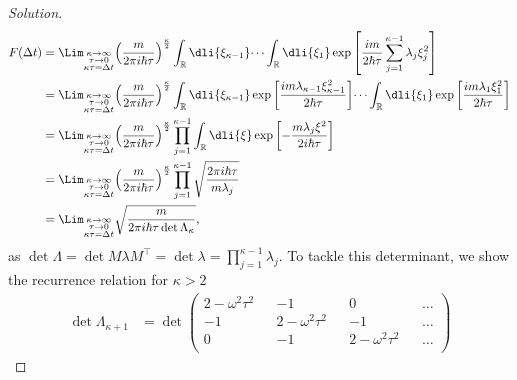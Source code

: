 \begin{proof}[Solution]
   \begin{align*}
      F(\Delta t) &= \Lim_{\substack{\kappa \to \infty\\ \tau \to 0\\ \kappa \tau = \Delta t}}{\left(\frac{m}{2\pi i \hbar \tau}\right)^{\frac\kappa2}\int_{\mathbb{R}} \dli{\xi_{\kappa - 1}} \dots \int_{\mathbb{R}} \dli{\xi_1} \exp\left[\frac{im}{2 \hbar \tau} \sum_{j = 1}^{\kappa - 1} \lambda_j \xi_j^2\right]}\\
                  &= \Lim_{\substack{\kappa \to \infty\\ \tau \to 0\\ \kappa \tau = \Delta t}}{\left(\frac{m}{2\pi i \hbar \tau}\right)^{\frac\kappa2}\int_{\mathbb{R}} \dli{\xi_{\kappa - 1}} \exp\left[\frac{im \lambda_{\kappa - 1} \xi_{\kappa - 1}^2}{2 \hbar \tau}\right]\dots \int_{\mathbb{R}} \dli{\xi_1} \exp\left[\frac{im \lambda_1 \xi_{1}^2}{2 \hbar \tau}\right]}\\
                  &= \Lim_{\substack{\kappa \to \infty\\ \tau \to 0\\ \kappa \tau = \Delta t}}{\left(\frac{m}{2\pi i \hbar \tau}\right)^{\frac\kappa2} \prod_{j = 1}^{\kappa - 1} \int_{\mathbb{R}} \dli{\xi} \exp\left[-\frac{m \lambda_j \xi^2}{2i \hbar \tau}\right]}\\
                  &= \Lim_{\substack{\kappa \to \infty\\ \tau \to 0\\ \kappa \tau = \Delta t}}{\left(\frac{m}{2\pi i \hbar \tau}\right)^{\frac\kappa2} \prod_{j = 1}^{\kappa - 1} \sqrt{\frac{2\pi i\hbar \tau}{m \lambda_j}}}\\
                  &= \Lim_{\substack{\kappa \to \infty\\ \tau \to 0\\ \kappa \tau = \Delta t}}{\sqrt{\frac{m}{2\pi i \hbar \tau \det \Lambda_\kappa}}},
   \end{align*}
   as \(\det{\Lambda} = \det{M \lambda M^\top} = \det{\lambda} = \prod_{j = 1}^{\kappa - 1}{\lambda_{j}}.\) To tackle this determinant, we show the recurrence relation for \(\kappa > 2\)
   \begin{align*}
      \det \Lambda_{\kappa + 1} &= \det \begin{pmatrix}
         2- \omega^2 \tau^2 && -1 && 0 && \dots\\
         -1 && 2 - \omega^2 \tau^2 && -1 && \dots\\
         0 && -1 && 2 - \omega^2 \tau^2 && \dots\\

\end{pmatrix}
\end{align*}
\end{proof}
